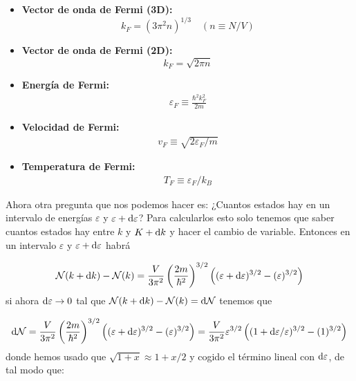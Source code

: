 \begin{itemize}
	\item \textbf{Vector de onda de Fermi (3D):}
	\begin{equation}
		k_F = (3\pi^2 n)^{1/3} \quad (n\equiv N/V) \label{Ec:06-01-05}
	\end{equation}
	\item \textbf{Vector de onda de Fermi (2D):}
	\begin{equation}
		k_F= \sqrt{2\pi n}
	\end{equation}
	\item \textbf{Energía de Fermi:}
	\begin{eqnarray}
		\varepsilon_F \equiv \frac{\hbar^2 k_F^2}{2m} \label{Ec:06-01-07}
	\end{eqnarray}
	\item \textbf{Velocidad de Fermi:}
	\begin{eqnarray}
		v_F \equiv \sqrt{2\varepsilon_F /m} \label{Ec:06-01-08}
	\end{eqnarray}
	\item \textbf{Temperatura de Fermi:}
	\begin{eqnarray}
		T_F \equiv \varepsilon_F / k_B
	\end{eqnarray}
\end{itemize}
Ahora otra pregunta que nos podemos hacer es: ¿Cuantos estados hay en un intervalo de energías $\varepsilon$ y $\varepsilon+\mathrm{d} \varepsilon$? Para calcularlos esto solo tenemos que saber cuantos estados hay entre $k$ y $K+\mathrm{d} k$ y hacer el cambio de variable. Entonces en un intervalo $\varepsilon$ y $\varepsilon+\mathrm{d} \varepsilon$ habrá 

\begin{equation*}
	\mathcal{N} (k+\mathrm{d} k) - \mathcal{N} (k) = \frac{V}{3\pi^2} \left( \frac{2m}{\hbar^2} \right)^{3/2} \left( (\varepsilon+\mathrm{d} \varepsilon)^{3/2} - (\varepsilon)^{3/2}  \right)
\end{equation*}
si ahora $\mathrm{d} \varepsilon \rightarrow 0$ tal que $\mathcal{N} (k+\mathrm{d} k) - \mathcal{N} (k) = \mathrm{d} \mathcal{N}$ tenemos que 

\begin{equation*}
	\mathrm{d} \mathcal{N} = \frac{V}{3\pi^2}\left( \frac{2m}{\hbar^2} \right)^{3/2} \left( (\varepsilon+\mathrm{d} \varepsilon)^{3/2} - (\varepsilon)^{3/2}  \right) = \frac{V}{3\pi^2} \varepsilon^{3/2} \left( (1+\mathrm{d} \varepsilon/\varepsilon)^{3/2} - (1)^{3/2}  \right) 
\end{equation*}
donde hemos usado que $\sqrt{1+x}\approx 1+x/2$ y cogido el término lineal con $\mathrm{d} \varepsilon$, de tal modo que:

